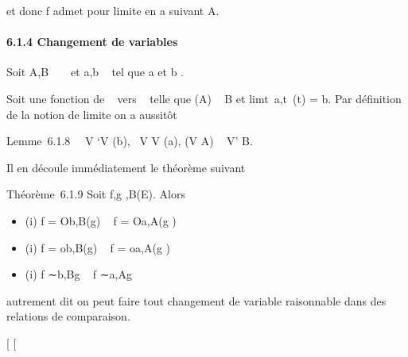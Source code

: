 et donc f admet \ell pour limite en a suivant A.

\paragraph{6.1.4 Changement de variables}

Soit A,B \subset~ ~ et a,b \in\overline{}~ tel que a
\in\overlineA et b \in\overlineB.

Soit \phi une fonction de ~ vers ~ telle que \phi(A) \subset~ B et
limt\rightarrow~a,t\inA~\phi(t) = b. Par définition
de la notion de limite on a aussitôt

Lemme~6.1.8 \forall~~V `\in V (b),
\exists~V \in V (a), \phi(V \bigcap A) \subset~ V' \bigcap B.

Il en découle immédiatement le théorème suivant

Théorème~6.1.9 Soit f,g ,B(E). Alors

\begin{itemize}
\itemsep1pt\parskip0pt
\item
  (i) f = Ob,B(g) \rigtharrow~ f \cdot \phi = Oa,A(g \cdot \phi)
\item
  (i) f = ob,B(g) \rigtharrow~ f \cdot \phi = oa,A(g \cdot \phi)
\item
  (i) f ∼b,Bg \rigtharrow~ f \cdot \phi ∼a,Ag \cdot \phi
\end{itemize}

autrement dit on peut faire tout changement de variable raisonnable dans
des relations de comparaison.

{[}
{[}
